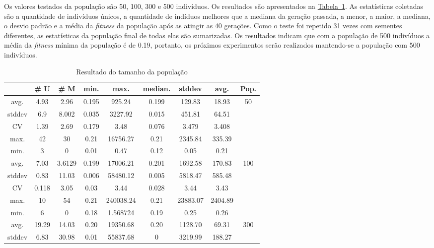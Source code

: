 \documentclass[a4paper]{paper}
\begin{document}
Os valores testados da população são 50, 100, 300 e 500 indivíduos. Os resultados
são apresentados na \hyperref[tbl:result_pop]{Tabela~\ref*{tbl:result_pop}}.
As estatísticas coletadas são a quantidade de indivíduos únicos, a quantidade de
indíduos melhores que a mediana da geração passada, a menor, a maior, a mediana,
o desvio padrão e a média da \textit{fitness} da população após as atingir as
40 gerações. Como o teste foi repetido 31 vezes com sementes diferentes, as
estatísticas da população final de todas elas são sumarizadas. Os resultados
indicam que com a população de 500 indivíduos a média da \textit{fitness} mínima
da população é de 0.19, portanto, os próximos experimentos serão realizados
mantendo-se a população com 500 indivíduos.

\noindent
\begin{table}[h!]
  \center
  \caption{Resultado do tamanho da população}
  \label{tbl:result_pop}
  \begin{tabular}{| c | c | c | c | c | c | c | c | c |}
    \hline
    &  \# U & \# M & min. & max. & median. & stddev & avg. & Pop. \\ \hline \hline
    avg. & 4.93 & 2.96 & 0.195 & 925.24 & 0.199 & 129.83 & 18.93 &  \multirow{5}{1.5cm}{50} \\ \cline{1-8}
    stddev & 6.9 & 8.002 & 0.035 & 3227.92 & 0.015 & 451.81 & 64.51 & \\ \cline{1-8}
    CV & 1.39 & 2.69 & 0.179 & 3.48 & 0.076 & 3.479 & 3.408 & \\ \cline{1-8}
    max. & 42 & 30 & 0.21 & 16756.27 & 0.21 & 2345.84 & 335.39 & \\ \cline{1-8}
    min. & 3 & 0 & 0.01 & 0.47 & 0.12 & 0.05 & 0.21 & \\ \hline \hline
    avg. & 7.03 & 3.6129 & 0.199 & 17006.21 & 0.201 & 1692.58 & 170.83 & \multirow{5}{1.5cm}{100} \\ \cline{1-8}
    stddev & 0.83 & 11.03 & 0.006 & 58480.12 & 0.005 & 5818.47 & 585.48 & \\ \cline{1-8}
    CV & 0.118 & 3.05 & 0.03 & 3.44 & 0.028 & 3.44 & 3.43 & \\ \cline{1-8}
    max. & 10 & 54 & 0.21 & 240038.24 & 0.21 & 23883.07 & 2404.89  & \\ \cline{1-8}
    min. & 6 & 0 & 0.18 & 1.568724 & 0.19 & 0.25 & 0.26 & \\ \hline \hline
    avg. & 19.29 & 14.03 & 0.20 & 19350.68 & 0.20 & 1128.70 & 69.31 & \multirow{5}{1.5cm}{300} \\ \cline{1-8}
    stddev & 6.83 & 30.98 & 0.01 & 55837.68 & 0 & 3219.99 & 188.27 & \\ \cline{1-8}

\end{tabular}
\end{table}
\end{document}
